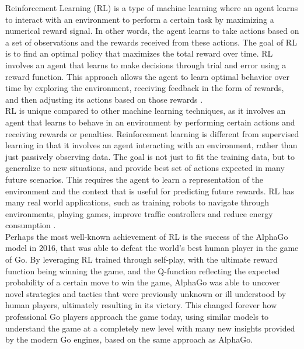 \documentclass{article}
\begin{document}
Reinforcement Learning (RL) is a type of machine learning where an agent learns to interact with an environment to perform a certain task by maximizing a numerical reward signal. In other words, the agent learns to take actions based on a set of observations and the rewards received from these actions. The goal of RL is to find an optimal policy that maximizes the total reward over time. RL involves an agent that learns to make decisions through trial and error using a reward function. This approach allows the agent to learn optimal behavior over time by exploring the environment, receiving feedback in the form of rewards, and then adjusting its actions based on those rewards \cite{sutton2015reinforcement}. \\

RL is unique compared to other machine learning techniques, as it involves an agent that learns to behave in an environment by performing certain actions and receiving rewards or penalties. Reinforcement learning is different from supervised learning in that it involves an agent interacting with an environment, rather than just passively observing data. The goal is not just to fit the training data, but to generalize to new situations, and provide best set of actions expected in many future scenarios. This requires the agent to learn a representation of the environment and the context that is useful for predicting future rewards. RL has many real world applications, such as training robots to navigate through environments\cite{faust2018prm}, playing games\cite{silver2016mastering, fan2023review}, improve traffic controllers\cite{el-tantawy2013multiagent} and reduce energy consumption \cite{xu2020reinforcement}.\\

Perhaps the most well-known achievement of RL is the success of the AlphaGo model in 2016, that was able to defeat the world's best human player in the game of Go. By leveraging RL trained through self-play, with the ultimate reward function being winning the game, and the Q-function reflecting the expected probability of a certain move to win the game\cite{silver2016mastering}, AlphaGo was able to uncover novel strategies and tactics that were previously unknown or ill understood by human players, ultimately resulting in its victory. This changed forever how professional Go players approach the game today, using similar models to understand the game at a completely new level with many new insights provided by the modern Go engines, based on the same approach as AlphaGo\cite{egri-nagy2020game}. \\
\end{document}
